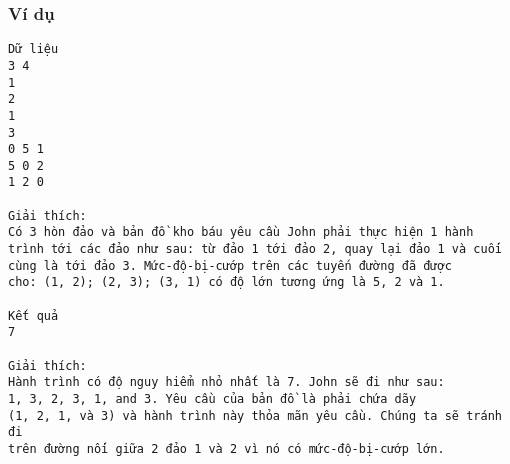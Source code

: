 \subsubsection{   Ví dụ  }
\begin{verbatim}
Dữ liệu
3 4
1
2
1
3
0 5 1
5 0 2
1 2 0

Giải thích:
Có 3 hòn đảo và bản đồ kho báu yêu cầu John phải thực hiện 1 hành 
trình tới các đảo như sau: từ đảo 1 tới đảo 2, quay lại đảo 1 và cuối 
cùng là tới đảo 3. Mức-độ-bị-cướp trên các tuyến đường đã được 
cho: (1, 2); (2, 3); (3, 1) có độ lớn tương ứng là 5, 2 và 1.

Kết quả
7

Giải thích:
Hành trình có độ nguy hiểm nhỏ nhất là 7. John sẽ đi như sau: 
1, 3, 2, 3, 1, and 3. Yêu cầu của bản đồ là phải chứa dãy
(1, 2, 1, và 3) và hành trình này thỏa mãn yêu cầu. Chúng ta sẽ tránh đi 
trên đường nối giữa 2 đảo 1 và 2 vì nó có mức-độ-bị-cướp lớn.
\end{verbatim}